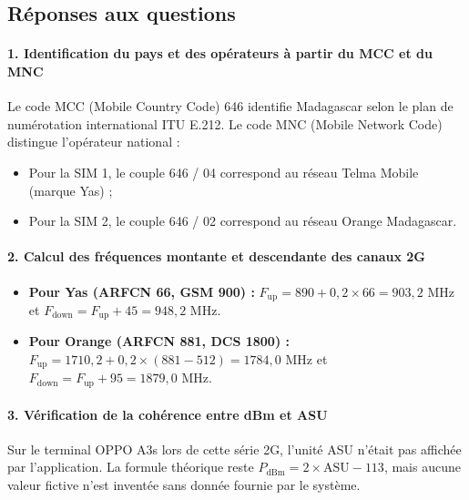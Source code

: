 \documentclass[11pt,a4paper]{article}
\begin{document}
\subsection{R\'eponses aux questions}

\paragraph{1. Identification du pays et des op\'erateurs \`a partir du MCC et du MNC}
Le code MCC (Mobile Country Code) 646 identifie Madagascar selon le plan de num\'erotation international ITU E.212. Le code MNC (Mobile Network Code) distingue l'op\'erateur national :
\begin{itemize}[noitemsep]
    \item Pour la SIM 1, le couple 646 / 04 correspond au r\'eseau Telma Mobile (marque Yas) ;
    \item Pour la SIM 2, le couple 646 / 02 correspond au r\'eseau Orange Madagascar.
\end{itemize}

\paragraph{2. Calcul des fr\'equences montante et descendante des canaux 2G}
\begin{itemize}[noitemsep]
    \item \textbf{Pour Yas (ARFCN 66, GSM 900) :} $F_{\text{up}} = 890 + 0{,}2 \times 66 = 903{,}2\text{ MHz}$ et $F_{\text{down}} = F_{\text{up}} + 45 = 948{,}2\text{ MHz}$.
    \item \textbf{Pour Orange (ARFCN 881, DCS 1800) :} $F_{\text{up}} = 1710{,}2 + 0{,}2 \times (881 - 512) = 1784{,}0\text{ MHz}$ et $F_{\text{down}} = F_{\text{up}} + 95 = 1879{,}0\text{ MHz}$.
\end{itemize}

\paragraph{3. V\'erification de la coh\'erence entre dBm et ASU}
Sur le terminal OPPO A3s lors de cette s\'erie 2G, l'unit\'e ASU n'\'etait pas affich\'ee par l'application. La formule th\'eorique reste $P_{\text{dBm}} = 2 \times \text{ASU} - 113$, mais aucune valeur fictive n'est invent\'ee sans donn\'ee fournie par le syst\`eme.
\end{document}
